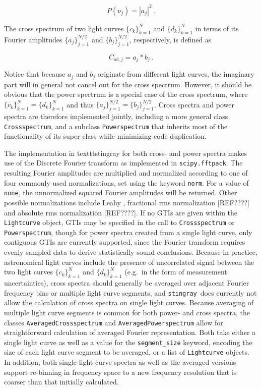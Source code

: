 \documentclass[12pt]{emulateapj}
\newcommand{\stingray}{\texttt{stingray}\xspace}
\begin{document}
\begin{equation}
P(\nu_j) = |a_j|^2 \, .
\end{equation}

\noindent The cross spectrum of two light curves $\{c_k\}_{k=1}^N$ and  $\{d_k\}_{k=1}^N$ in terms of its Fourier amplitudes $\{a_j\}_{j=1}^{N/2}$ and  $\{b_j\}_{j=1}^{N/2}$, respectively, is defined as

\begin{equation}
C_{ab,j} = a_j*b_j \, .
\end{equation}

\noindent Notice that because $a_j$ and $b_j$ originate from different light curves, the imaginary part will in general not cancel out for the cross spectrum. However, it should be obvious that the power spectrum is a special case of the cross spectrum, where $\{c_k\}_{k=1}^N = \{d_k\}_{k=1}^N$ and thus  $\{a_j\}_{j=1}^{N/2} = \{b_j\}_{j=1}^{N/2}$. Cross spectra and power spectra are therefore implemented jointly, including a more general class \texttt{Crossspectrum}, and a subclass \texttt{Powerspectrum} that inherits most of the functionality of its super class while minimizing code duplication.

The implementation in texttt{stingray} for both cross- and power spectra makes use of the Discrete Fourier transform as implemented in \texttt{scipy.fftpack}. The resulting Fourier amplitudes are multiplied and normalized according to one of four commonly used normalizations, set using the keyword \texttt{norm}. For a value of \texttt{none}, the unnormalized squared Fourier amplitudes will be returned. Other possible normalizations include Leahy \citep{leahy1984}, fractional rms normalization [REF????] and absolute rms normalization [REF????]. If no GTIs are given within the \texttt{Lightcurve} object, GTIs may be specified in the call to \texttt{Crossspectrum} or \texttt{Powerspectrum}, though for power spectra created from a single light curve, only contiguous GTIs are currently supported, since the Fourier transform requires evenly sampled data to derive statistically sound conclusions. Because in practice, astronomical light curves include the presence of uncorrelated signal between the two light curves $\{c_k\}_{k=1}^N$ and  $\{d_k\}_{k=1}^N$ (e.g.\ in the form of measurement uncertainties), cross spectra should generally be averaged over adjacent Fourier frequency bins or multiple light curve segments, and \stingray\ does currently not allow the calculation of cross spectra on single light curves. Because averaging of multiple light curve segments is common for both power- and cross spectra, the classes \texttt{AveragedCrossspectrum} and \texttt{AveragedPowerspectrum} allow for straightforward calculation of averaged Fourier representation. Both take either a single light curve as well as a  value for the \texttt{segment\_size} keyword, encoding the size of each light curve segment to be averaged, or a list of \texttt{Lightcurve} objects. In addition, both single-light curve spectra as well as the averaged versions support re-binning in frequency space to a new frequency resolution that is coarser than that initially calculated. 
\end{document}

